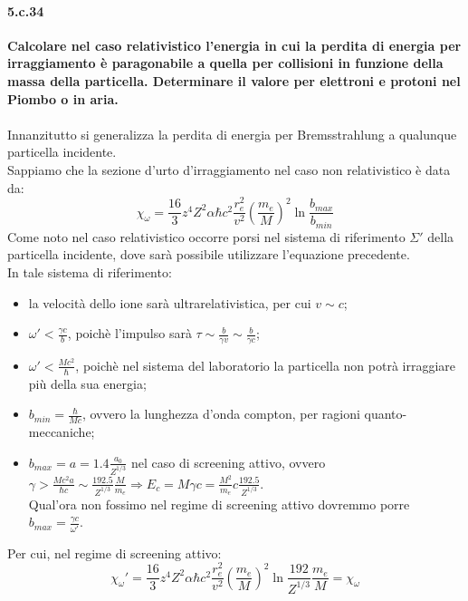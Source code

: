 \documentclass[twoside]{article}
\begin{document}
\paragraph{5.c.34}\textbf{Calcolare nel caso relativistico l’energia in cui la perdita di energia per irraggiamento è paragonabile a quella per collisioni in funzione della massa della particella. Determinare il valore per elettroni e protoni nel Piombo o in aria.}\\
\\
Innanzitutto si generalizza la perdita di energia per Bremsstrahlung a qualunque particella incidente.\\
Sappiamo che la sezione d'urto d'irraggiamento nel caso non relativistico è data da:
\begin{equation}
    \chi_\omega=\frac{16}{3}z^4Z^2\alpha \hbar c^2\frac{r_e^2}{v^2}\left(\frac{m_e}{M}\right)^2\ln{\frac{b_{max}}{b_{min}}}
\end{equation}
Come noto nel caso relativistico occorre porsi nel sistema di riferimento $\Sigma'$ della particella incidente, dove sarà possibile utilizzare l'equazione precedente.\\
In tale sistema di riferimento:
\begin{itemize}
    \item la velocità dello ione sarà ultrarelativistica, per cui $v\sim c$;
    \item $\omega'<\frac{\gamma c}{b}$, poichè l'impulso sarà $\tau\sim\frac{b}{\gamma v}\sim \frac{b}{\gamma c}$;
    \item $\omega'<\frac{Mc^2}{\hbar}$, poichè nel sistema del laboratorio la particella non potrà irraggiare più della sua energia;
    \item $b_{min}=\frac{\hbar}{Mc}$, ovvero la lunghezza d'onda compton, per ragioni quanto-meccaniche;
    \item $b_{max}=a=1.4\frac{a_0}{Z^{1/3}}$ nel caso di screening attivo, ovvero $\gamma>\frac{Mc^2 a}{\hbar c}\sim \frac{192.5}{Z^{1/3}}\frac{M}{m_e} \Longrightarrow E_c=M\gamma c=\frac{M^2}{m_e}c\frac{192.5}{Z^{1/3}}$.\\
    Qual'ora non fossimo nel regime di screening attivo dovremmo porre $b_{max}=\frac{\gamma c}{\omega'}$.\\
\end{itemize}
Per cui, nel regime di screening attivo:
\begin{equation}
    \chi_\omega'=\frac{16}{3}z^4Z^2\alpha \hbar c^2\frac{r_e^2}{v^2}\left(\frac{m_e}{M}\right)^2\ln{\frac{192}{Z^{1/3}}\frac{m_e}{M}}=\chi_\omega
\end{equation}
\end{document}
